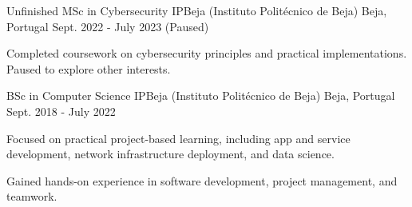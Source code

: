 


\begin{cventries}





  \cventry
  {Unfinished MSc in Cybersecurity} %
  {IPBeja (Instituto Politécnico de Beja)} %
  {Beja, Portugal} %
  {Sept. 2022 - July 2023 (Paused)} %
  {
    \begin{cvitems}
      \item {Completed coursework on cybersecurity principles and practical implementations. Paused to explore other interests.}
    \end{cvitems}
  }

  \vspace{0.4cm}


  \cventry
  {BSc in Computer Science} %
  {IPBeja (Instituto Politécnico de Beja)} %
  {Beja, Portugal} %
  {Sept. 2018 - July 2022} %
  {
    \begin{cvitems}
      \item {Focused on practical project-based learning, including app and service development, network infrastructure deployment, and data science.}
      \item {Gained hands-on experience in software development, project management, and teamwork.}
    \end{cvitems}
  }


\end{cventries}
